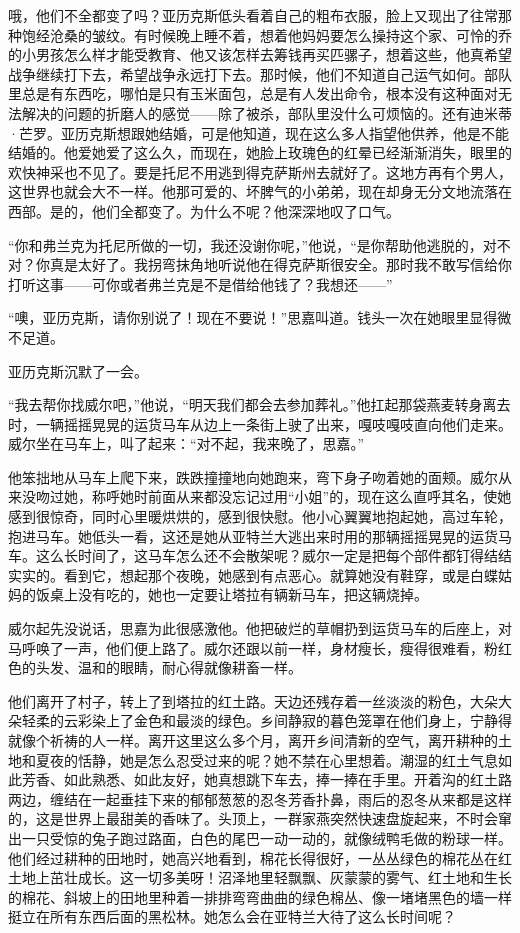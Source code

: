 \par 哦，他们不全都变了吗？亚历克斯低头看着自己的粗布衣服，脸上又现出了往常那种饱经沧桑的皱纹。有时候晚上睡不着，想着他妈妈要怎么操持这个家、可怜的乔的小男孩怎么样才能受教育、他又该怎样去筹钱再买匹骡子，想着这些，他真希望战争继续打下去，希望战争永远打下去。那时候，他们不知道自己运气如何。部队里总是有东西吃，哪怕是只有玉米面包，总是有人发出命令，根本没有这种面对无法解决的问题的折磨人的感觉——除了被杀，部队里没什么可烦恼的。还有迪米蒂·芒罗。亚历克斯想跟她结婚，可是他知道，现在这么多人指望他供养，他是不能结婚的。他爱她爱了这么久，而现在，她脸上玫瑰色的红晕已经渐渐消失，眼里的欢快神采也不见了。要是托尼不用逃到得克萨斯州去就好了。这地方再有个男人，这世界也就会大不一样。他那可爱的、坏脾气的小弟弟，现在却身无分文地流落在西部。是的，他们全都变了。为什么不呢？他深深地叹了口气。
\par “你和弗兰克为托尼所做的一切，我还没谢你呢，”他说，“是你帮助他逃脱的，对不对？你真是太好了。我拐弯抹角地听说他在得克萨斯很安全。那时我不敢写信给你打听这事——可你或者弗兰克是不是借给他钱了？我想还——”
\par “噢，亚历克斯，请你别说了！现在不要说！”思嘉叫道。钱头一次在她眼里显得微不足道。
\par 亚历克斯沉默了一会。
\par “我去帮你找威尔吧，”他说，“明天我们都会去参加葬礼。”他扛起那袋燕麦转身离去时，一辆摇摇晃晃的运货马车从边上一条街上驶了出来，嘎吱嘎吱直向他们走来。威尔坐在马车上，叫了起来：“对不起，我来晚了，思嘉。”
\par 他笨拙地从马车上爬下来，跌跌撞撞地向她跑来，弯下身子吻着她的面颊。威尔从来没吻过她，称呼她时前面从来都没忘记过用“小姐”的，现在这么直呼其名，使她感到很惊奇，同时心里暖烘烘的，感到很快慰。他小心翼翼地抱起她，高过车轮，抱进马车。她低头一看，这还是她从亚特兰大逃出来时用的那辆摇摇晃晃的运货马车。这么长时间了，这马车怎么还不会散架呢？威尔一定是把每个部件都钉得结结实实的。看到它，想起那个夜晚，她感到有点恶心。就算她没有鞋穿，或是白蝶姑妈的饭桌上没有吃的，她也一定要让塔拉有辆新马车，把这辆烧掉。
\par 威尔起先没说话，思嘉为此很感激他。他把破烂的草帽扔到运货马车的后座上，对马呼唤了一声，他们便上路了。威尔还跟以前一样，身材瘦长，瘦得很难看，粉红色的头发、温和的眼睛，耐心得就像耕畜一样。
\par 他们离开了村子，转上了到塔拉的红土路。天边还残存着一丝淡淡的粉色，大朵大朵轻柔的云彩染上了金色和最淡的绿色。乡间静寂的暮色笼罩在他们身上，宁静得就像个祈祷的人一样。离开这里这么多个月，离开乡间清新的空气，离开耕种的土地和夏夜的恬静，她是怎么忍受过来的呢？她不禁在心里想着。潮湿的红土气息如此芳香、如此熟悉、如此友好，她真想跳下车去，捧一捧在手里。开着沟的红土路两边，缠结在一起垂挂下来的郁郁葱葱的忍冬芳香扑鼻，雨后的忍冬从来都是这样的，这是世界上最甜美的香味了。头顶上，一群家燕突然快速盘旋起来，不时会窜出一只受惊的兔子跑过路面，白色的尾巴一动一动的，就像绒鸭毛做的粉球一样。他们经过耕种的田地时，她高兴地看到，棉花长得很好，一丛丛绿色的棉花丛在红土地上茁壮成长。这一切多美呀！沼泽地里轻飘飘、灰蒙蒙的雾气、红土地和生长的棉花、斜坡上的田地里种着一排排弯弯曲曲的绿色棉丛、像一堵堵黑色的墙一样挺立在所有东西后面的黑松林。她怎么会在亚特兰大待了这么长时间呢？
